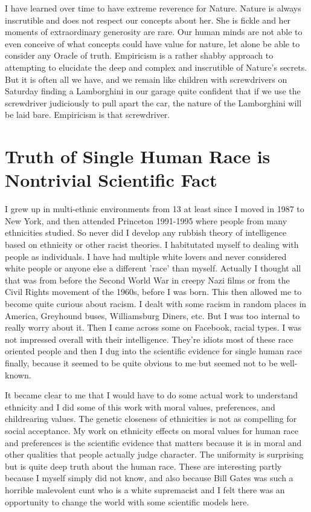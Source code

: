 \documentclass{amsart}
\begin{document}
I have learned over time to have extreme reverence for Nature.  Nature is always inscrutible and does not respect our concepts about her.  She is fickle and her moments of extraordinary generosity are rare.  Our human minds are not able to even conceive of what concepts could have value for nature, let alone be able to consider any Oracle of truth.  Empiricism is a rather shabby approach to attempting to elucidate the deep and complex and inscrutible of Nature's secrets. But it is often all we have, and we remain like children with screwdrivers on Saturday finding a Lamborghini in our garage quite confident that if we use the screwdriver judiciously to pull apart the car, the nature of the Lamborghini will be laid bare.  Empiricism is that screwdriver.

\section{Truth of Single Human Race is Nontrivial Scientific Fact}

I grew up in multi-ethnic environments from 13 at least since I moved in 1987 to New York, and then attended Princeton 1991-1995 where people from many ethnicities studied.  So never did I develop any rubbish theory of intelligence based on ethnicity or other racist theories.  I habitutated myself to dealing with people as individuals.  I have had multiple white lovers and never considered white people or anyone else a different 'race' than myself.  Actually I thought all that was from before the Second World War in creepy Nazi films or from the Civil Rights movement of the 1960s, before I was born.  This then allowed me to become quite curious about racism.  I dealt with some racism in random places in America, Greyhound buses, Williamsburg Diners, etc.  But I was too internal to really worry about it.  Then I came across some on Facebook, racial types.  I was not impressed overall with their intelligence.  They're idiots most of these race oriented people and then I dug into the scientific evidence for single human race finally, because it seemed to be quite obvious to me but seemed not to be well-known.

It became clear to me that I would have to do some actual work to understand ethnicity and I did some of this work with moral values, preferences, and childrearing values.  The genetic closeness of ethnicities is not as compelling for social acceptance.  My work on ethnicity effects on moral values for human race and preferences is the scientific evidence that matters because it is in moral and other qualities that people actually judge character.  The uniformity is surprising but is quite deep truth about the human race.  These are interesting partly because I myself simply did not know, and also because Bill Gates was such a horrible malevolent cunt who is a white supremacist and I felt there was an opportunity to change the world with some scientific models here.
\end{document}
